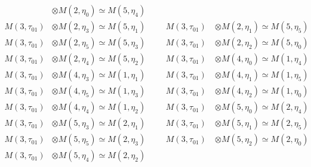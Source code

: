 \begin{align*}
&\otimes M(2,\eta_{0}) \simeq M(5,\eta_{4})\\
M(3,\tau_{01}) &\otimes M(2,\eta_{3}) \simeq M(5,\eta_{1}) &&& M(3,\tau_{01}) \
&\otimes M(2,\eta_{1}) \simeq M(5,\eta_{5})\\
M(3,\tau_{01}) &\otimes M(2,\eta_{5}) \simeq M(5,\eta_{3}) &&& M(3,\tau_{01}) \
&\otimes M(2,\eta_{2}) \simeq M(5,\eta_{0})\\
M(3,\tau_{01}) &\otimes M(2,\eta_{4}) \simeq M(5,\eta_{2}) &&& M(3,\tau_{01}) \
&\otimes M(4,\eta_{0}) \simeq M(1,\eta_{4})\\
M(3,\tau_{01}) &\otimes M(4,\eta_{3}) \simeq M(1,\eta_{1}) &&& M(3,\tau_{01}) \
&\otimes M(4,\eta_{1}) \simeq M(1,\eta_{5})\\
M(3,\tau_{01}) &\otimes M(4,\eta_{5}) \simeq M(1,\eta_{3}) &&& M(3,\tau_{01}) \
&\otimes M(4,\eta_{2}) \simeq M(1,\eta_{0})\\
M(3,\tau_{01}) &\otimes M(4,\eta_{4}) \simeq M(1,\eta_{2}) &&& M(3,\tau_{01}) \
&\otimes M(5,\eta_{0}) \simeq M(2,\eta_{4})\\
M(3,\tau_{01}) &\otimes M(5,\eta_{3}) \simeq M(2,\eta_{1}) &&& M(3,\tau_{01}) \
&\otimes M(5,\eta_{1}) \simeq M(2,\eta_{5})\\
M(3,\tau_{01}) &\otimes M(5,\eta_{5}) \simeq M(2,\eta_{3}) &&& M(3,\tau_{01}) \
&\otimes M(5,\eta_{2}) \simeq M(2,\eta_{0})\\
M(3,\tau_{01}) &\otimes M(5,\eta_{4}) \simeq M(2,\eta_{2})\\
\end{align*}

